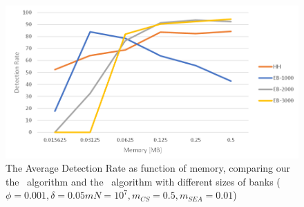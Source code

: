 \begin{figure}
    \includegraphics[width=\linewidth]{HH/figures/EB.png}
    \caption[Average Detection Rate of \cs\ and the \eb\ algorithms]{The Average Detection Rate as function of memory, comparing our the \cs\ algorithm and the \eb\ algorithm with different sizes of banks ($\phi=0.001,\delta=0.05m N=10^7, m_{CS}=0.5, m_{SEA}=0.01$)}
    \label{figure5}
\end{figure}